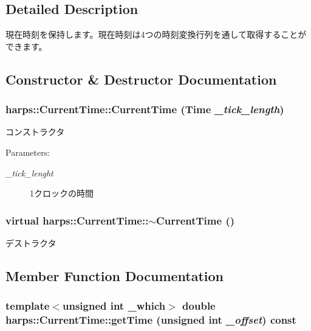\subsection{Detailed Description}
現在時刻を保持します。現在時刻は4つの時刻変換行列を通して取得することができます。 

\subsection{Constructor \& Destructor Documentation}
\subsubsection[CurrentTime]{\setlength{\rightskip}{0pt plus 5cm}harps::CurrentTime::CurrentTime (Time {\em \_\-tick\_\-length})\hspace{0.3cm}{\tt  [inline]}}\label{classharps_1_1CurrentTime_6a58e37c3b82280888f7d39e9387fda9}


コンストラクタ \begin{Desc}
\item[Parameters:]
\begin{description}
\item[{\em \_\-tick\_\-lenght}]1クロックの時間 \end{description}
\end{Desc}
\subsubsection[$\sim$CurrentTime]{\setlength{\rightskip}{0pt plus 5cm}virtual harps::CurrentTime::$\sim$CurrentTime ()\hspace{0.3cm}{\tt  [inline, virtual]}}\label{classharps_1_1CurrentTime_02901d4094d29badc64b00c1d428e34b}


デストラクタ 

\subsection{Member Function Documentation}
\subsubsection[getTime]{\setlength{\rightskip}{0pt plus 5cm}template$<$unsigned int \_\-which$>$ double harps::CurrentTime::getTime (unsigned int {\em \_\-offset}) const\hspace{0.3cm}{\tt  [inline]}}\label{classharps_1_1CurrentTime_b4e5c08585a7599b89db2dac14b9c4d1}


